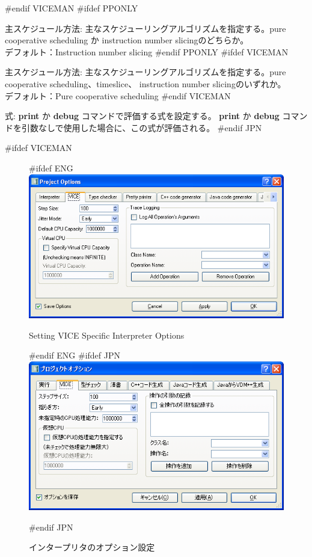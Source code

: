 \documentclass[\pformat,12pt]{article}
\newcommand{\guicmd}[1]{{\sf #1}}
\newcommand{\guicmd}[1]{{\gt #1}}
\begin{document}
\begin{list}{}{}
#endif VICEMAN
#ifdef PPONLY
\item[\guicmd{主スケジュール方法}:]
  主なスケジューリングアルゴリズムを指定する。pure cooperative scheduling か 
  instruction number slicingのどちらか。 \\
  デフォルト：Instruction number slicing
#endif PPONLY
#ifdef VICEMAN
\item[\guicmd{主スケジュール方法}:]
  主なスケジューリングアルゴリズムを指定する。pure cooperative scheduling、timeslice、
  instruction number slicingのいずれか。 \\
  デフォルト：Pure cooperative scheduling
#endif VICEMAN

\item[\textsf{式}:]
  \textbf{print} か \textbf{debug} コマンドで評価する式を設定する。
  \textbf{print} か \textbf{debug} コマンドを引数なしで使用した場合に、この式が評価される。
#endif JPN
\end{list}

#ifdef VICEMAN
\begin{figure}[tbh]
\begin{center}
#ifdef ENG
\includegraphics[width=12.5cm]{viceOptions-viceENG.png}
\caption{Setting VICE Specific Interpreter Options}
#endif ENG
#ifdef JPN
\includegraphics[width=12.5cm]{viceOptions-vice.png}
\caption{インタープリタのオプション設定}
#endif JPN
\label{fig:optintvice}
\end{center}
\end{figure}
\end{document}
